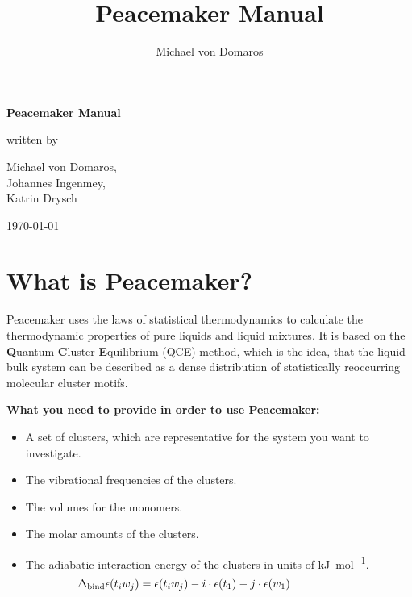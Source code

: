 \documentclass{scrartcl}
\begin{document}


\title{Peacemaker Manual}
\author{Michael von Domaros}
\begin{titlepage}
    \centering
    \Large

    \vspace*{5ex}
    \textbf{\Huge Peacemaker Manual}

    \vspace{\fill}
    written by
    
    \vspace{1ex}
    Michael von Domaros,\\
    Johannes Ingenmey,\\
    Katrin Drysch
    
    \vspace{2ex}
    \today
    \vspace{\fill}
\end{titlepage}

\tableofcontents
\pagebreak

\section{What is Peacemaker?}
\label{sec:peacemaker}
Peacemaker uses the laws of statistical thermodynamics to calculate the thermodynamic properties of
pure liquids and liquid mixtures.
It is based on the \textbf{Q}uantum \textbf{C}luster \textbf{E}quilibrium (QCE) method, which is 
the idea, that the liquid bulk system can be described as a dense distribution of statistically
reoccurring molecular cluster motifs.

\textbf{What you need to provide in order to use Peacemaker:}\vspace{-0.2cm}
\begin{itemize}[noitemsep]
    \item A set of clusters, which are representative for the system you want to investigate.
    \item The vibrational frequencies of the clusters.
    \item The volumes for the monomers.
    \item The molar amounts of the clusters.
    \item The adiabatic interaction energy of the clusters in units of \si{\kilo\joule\per\mole}.\vspace{-0.2cm}
    \begin{equation*}
        \hspace{-2.2cm}\Delta_\mathrm{bind} \epsilon(t_i w_j) = \epsilon(t_i w_j) - i \cdot \epsilon(t_1) - j \cdot \epsilon(w_1)
    \end{equation*}
\end{itemize}
\end{document}
